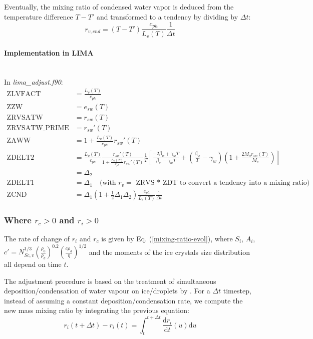 {Eventually, the mixing ratio of condensed water vapor is deduced from the temperature difference $T - T'$ and transformed to a tendency by dividing by $\Delta t$:
\begin{equation}
 r_{v,cnd} = (T - T') \frac{c_{ph}}{L_v(T)} \frac{1}{\Delta t}
\end{equation}

\paragraph{Implementation in LIMA}
~\\
In \emph{lima\_adjust.f90}:
\begin{align}
 \mathrm{ZLVFACT} &= \frac{L_v(T)}{c_{ph}} \\
 \mathrm{ZZW} &= e_{sw}(T) \\
 \mathrm{ZRVSATW} &= r_{sw}(T) \\
 \mathrm{ZRVSATW\_PRIME} &= r_{sw}'(T) \\
 \mathrm{ZAWW} &= 1 + \frac{L_v(T)}{c_{ph}} r_{sw}'(T) \\
 \mathrm{ZDELT2} &= \frac{L_v(T)}{c_{ph}} \frac{r_{sw}'(T)}{1 + \frac{L_v(T)}{c_{ph}} r_{sw}'(T)} \frac{1}{T} \left[ \frac{-2 \beta_w + \gamma_w T}{\beta_w - \gamma_w T} + \left( \frac{\beta_w}{T} - \gamma_w \right) \left( 1 + \frac{2 M_d r_{sw}(T)}{M_v} \right)\right] \\
 &= \Delta_2 \\
 \mathrm{ZDELT1} &= \Delta_1 \quad \text{(with $r_v = $ ZRVS * ZDT to convert a tendency into a mixing ratio)}\\
 \mathrm{ZCND} &= \Delta_1 \left( 1 + \frac{1}{2} \Delta_1 \Delta_2 \right) \frac{c_{ph}}{L_v(T)} \frac{1}{\Delta t}
\end{align}

\subsubsection{Where $r_c>0$ and $r_i>0$}

The rate of change of $r_i$ and $r_c$ is given by Eq. (\ref{mixing-ratio-evol}), where $S_i$, $A_i$, $c'=N_{Sc,v}^{1/3} \left(\frac{\rho_0}{\rho_d}\right)^{0.2} \left(\frac{c \rho_d}{\eta}\right)^{1/2} $ and the moments of the ice crystals size distribution all depend on time $t$.

The adjustment procedure is based on the treatment of simultaneous deposition/condensation of water vapour on ice/droplets by \citet{Reisin1996}. For a $\Delta t$ timestep, instead of assuming a constant deposition/condensation rate, we compute the new mass mixing ratio by integrating the previous equation:
\begin{equation}
 r_i(t + \Delta t) - r_i(t) = \int_t^{t + \Delta t} \frac{\mathrm{d}r_i}{\mathrm{d}t} (u) \mathrm{d}u
\end{equation}

}
